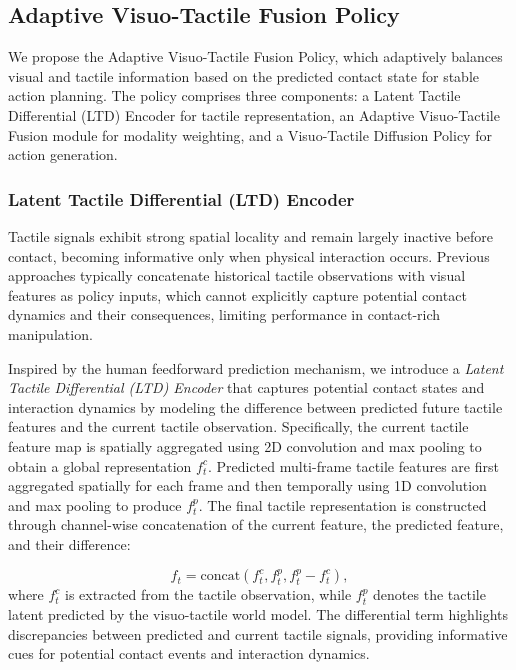\subsection{Adaptive Visuo-Tactile Fusion Policy}
\label{sec:fusion_policy}
We propose the Adaptive Visuo-Tactile Fusion Policy, which adaptively balances visual and tactile information based on the predicted contact state for stable action planning. The policy comprises three components: a Latent Tactile Differential (LTD) Encoder for tactile representation, an Adaptive Visuo-Tactile Fusion module for modality weighting, and a Visuo-Tactile Diffusion Policy for action generation.

\subsubsection{Latent Tactile Differential (LTD) Encoder}
Tactile signals exhibit strong spatial locality and remain largely inactive before contact, becoming informative only when physical interaction occurs. Previous approaches typically concatenate historical tactile observations with visual features as policy inputs, which cannot explicitly capture potential contact dynamics and their consequences, limiting performance in contact-rich manipulation.

Inspired by the human feedforward prediction mechanism, we introduce a \textit{Latent Tactile Differential (LTD) Encoder} that captures potential contact states and interaction dynamics by modeling the difference between predicted future tactile features and the current tactile observation. Specifically, the current tactile feature map is spatially aggregated using 2D convolution and max pooling to obtain a global representation $f_t^c$. Predicted multi-frame tactile features are first aggregated spatially for each frame and then temporally using 1D convolution and max pooling to produce $f_t^p$. The final tactile representation is constructed through channel-wise concatenation of the current feature, the predicted feature, and their difference: 

\begin{equation}
f_t = \text{concat}(f_t^c, f_t^p, f_t^p - f_t^c),
\end{equation}
where $f_t^c$ is extracted from the tactile observation, while $f_t^p$ denotes the tactile latent predicted by the visuo-tactile world model. The differential term highlights discrepancies between predicted and current tactile signals, providing informative cues for potential contact events and interaction dynamics.

